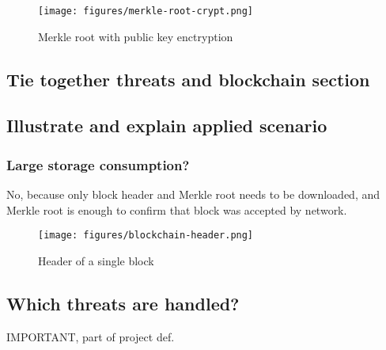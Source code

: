 \begin{figure}[ht]
  \centering
  \texttt{[image: figures/merkle-root-crypt.png]}
  \caption{\label{fig:merkle-root-crypt} Merkle root with public key enctryption}
\end{figure}



\subsection{Tie together threats and blockchain section}

\subsection{Illustrate and explain applied scenario}

\subsubsection{Large storage consumption?}
No, because only block header and Merkle root needs to be downloaded,
and Merkle root is enough to confirm that block was accepted by
network.

\begin{figure}[ht]
  \centering
  \texttt{[image: figures/blockchain-header.png]}
  \caption{\label{fig:blockchain-header} Header of a single block}
\end{figure}


\subsection{Which threats are handled?}
IMPORTANT, part of project def.
